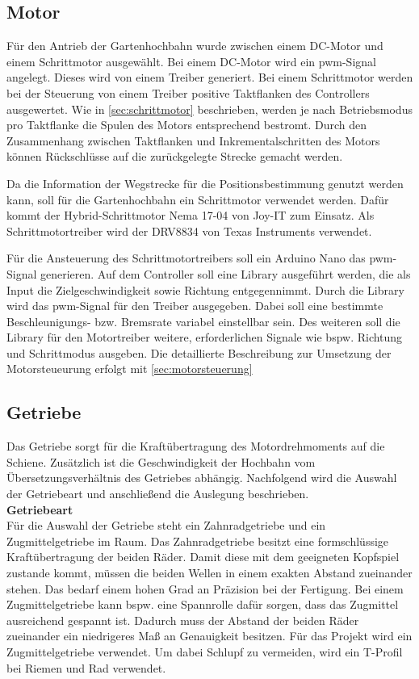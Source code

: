 \subsection{Motor}
\label{sec:konzeptMotor}
Für den Antrieb der Gartenhochbahn wurde zwischen einem DC-Motor und einem Schrittmotor ausgewählt. Bei einem DC-Motor wird ein \acrshort{pwm}-Signal angelegt. Dieses wird von einem Treiber generiert. Bei einem Schrittmotor werden bei der Steuerung von einem Treiber positive Taktflanken des Controllers ausgewertet. Wie in \autoref{sec:schrittmotor} beschrieben, werden je nach Betriebsmodus pro Taktflanke die Spulen des Motors entsprechend bestromt. Durch den Zusammenhang zwischen Taktflanken und  Inkrementalschritten des Motors können Rückschlüsse auf die zurückgelegte Strecke gemacht werden.  

Da die Information der Wegstrecke für die Positionsbestimmung genutzt werden kann, soll für die Gartenhochbahn ein Schrittmotor verwendet werden. Dafür kommt der Hybrid-Schrittmotor Nema 17-04 von Joy-IT zum Einsatz. Als Schrittmotortreiber wird der DRV8834 von Texas Instruments verwendet. 


Für die Ansteuerung des Schrittmotortreibers soll ein Arduino Nano das \acrshort{pwm}-Signal generieren. Auf dem Controller soll eine Library ausgeführt werden, die als Input die Zielgeschwindigkeit sowie Richtung entgegennimmt. Durch die Library wird das \acrshort{pwm}-Signal für den Treiber ausgegeben. Dabei soll eine bestimmte Beschleunigungs- bzw. Bremsrate variabel einstellbar sein. Des weiteren soll die Library für den Motortreiber weitere, erforderlichen Signale wie bspw. Richtung und Schrittmodus ausgeben. Die detaillierte Beschreibung zur Umsetzung der Motorsteueurung erfolgt mit \autoref{sec:motorsteuerung} 



\subsection{Getriebe}
\label{sec:getriebekonzept}
Das Getriebe sorgt für die Kraftübertragung des Motordrehmoments auf die Schiene. Zusätzlich ist die Geschwindigkeit der Hochbahn vom Übersetzungsverhältnis des Getriebes abhängig. Nachfolgend wird die Auswahl der Getriebeart und anschließend die Auslegung beschrieben. \\

\textbf{Getriebeart}\\
Für die Auswahl der Getriebe steht ein Zahnradgetriebe und ein Zugmittelgetriebe im Raum. Das Zahnradgetriebe besitzt eine formschlüssige Kraftübertragung der beiden Räder. Damit diese mit dem geeigneten Kopfspiel zustande kommt, müssen die beiden Wellen in einem exakten Abstand zueinander stehen. Das bedarf einem hohen Grad an Präzision bei der Fertigung. Bei einem Zugmittelgetriebe kann bspw. eine Spannrolle dafür sorgen, dass das Zugmittel ausreichend gespannt ist. Dadurch muss der Abstand der beiden Räder zueinander ein niedrigeres Maß an Genauigkeit besitzen. 
Für das Projekt wird ein Zugmittelgetriebe verwendet. Um dabei Schlupf zu vermeiden, wird ein T-Profil bei Riemen und Rad verwendet. 
\\

